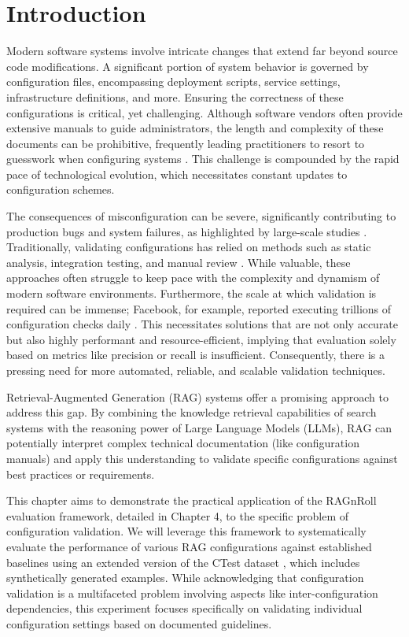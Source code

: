 \section{Introduction}
Modern software systems involve intricate changes that extend far beyond source code modifications. A significant portion of system behavior is governed by configuration files, encompassing deployment scripts, service settings, infrastructure definitions, and more. Ensuring the correctness of these configurations is critical, yet challenging. Although software vendors often provide extensive manuals to guide administrators, the length and complexity of these documents can be prohibitive, frequently leading practitioners to resort to guesswork when configuring systems \cite{Xiang.2020}. This challenge is compounded by the rapid pace of technological evolution, which necessitates constant updates to configuration schemes.

The consequences of misconfiguration can be severe, significantly contributing to production bugs and system failures, as highlighted by large-scale studies \cite{Tang.2015}. Traditionally, validating configurations has relied on methods such as static analysis, integration testing, and manual review \cite{Lian.2024}. While valuable, these approaches often struggle to keep pace with the complexity and dynamism of modern software environments. Furthermore, the scale at which validation is required can be immense; Facebook, for example, reported executing trillions of configuration checks daily \cite{Tang.2015}. This necessitates solutions that are not only accurate but also highly performant and resource-efficient, implying that evaluation solely based on metrics like precision or recall is insufficient. Consequently, there is a pressing need for more automated, reliable, and scalable validation techniques.

Retrieval-Augmented Generation (RAG) systems offer a promising approach to address this gap. By combining the knowledge retrieval capabilities of search systems with the reasoning power of Large Language Models (LLMs), RAG can potentially interpret complex technical documentation (like configuration manuals) and apply this understanding to validate specific configurations against best practices or requirements.

This chapter aims to demonstrate the practical application of the RAGnRoll evaluation framework, detailed in Chapter 4, to the specific problem of configuration validation. We will leverage this framework to systematically evaluate the performance of various RAG configurations against established baselines using an extended version of the CTest dataset \cite{Lian.2024}, which includes synthetically generated examples. While acknowledging that configuration validation is a multifaceted problem involving aspects like inter-configuration dependencies, this experiment focuses specifically on validating individual configuration settings based on documented guidelines.

